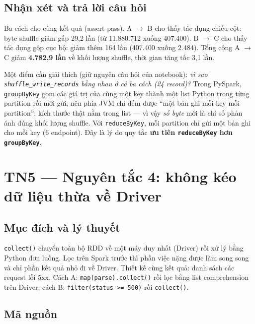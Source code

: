 \documentclass[12pt,a4paper,oneside]{article}
\begin{document}


\subsection{Nhận xét và trả lời câu hỏi}

Ba cách cho cùng kết quả (assert pass). A $\to$ B cho thấy tác dụng chiếu cột: byte shuffle giảm gấp 29,2 lần (từ 11.880.712 xuống 407.400). B $\to$ C cho thấy tác dụng gộp cục bộ: giảm thêm 164 lần (407.400 xuống 2.484). Tổng cộng A $\to$ C giảm \textbf{4.782,9 lần} về khối lượng shuffle, thời gian tăng tốc 3,1 lần.

Một điểm cần giải thích (giữ nguyên câu hỏi của notebook): \emph{vì sao \texttt{shuffle\_write\_records} bằng nhau ở cả ba cách (24 record)?} Trong PySpark, \texttt{groupByKey} gom các giá trị của cùng một key thành một list Python trong từng partition rồi mới gửi, nên phía JVM chỉ đếm được ``một bản ghi mỗi key mỗi partition''; kích thước thật nằm trong list --- vì vậy \emph{số byte} mới là chỉ số phản ánh đúng khối lượng shuffle. Với \texttt{reduceByKey}, mỗi partition chỉ gửi một bản ghi cho mỗi key (6 endpoint). Đây là lý do quy tắc \textbf{ưu tiên \texttt{reduceByKey} hơn \texttt{groupByKey}}.

\section{TN5 --- Nguyên tắc 4: không kéo dữ liệu thừa về Driver}
\label{sec:tn5}

\subsection{Mục đích và lý thuyết}

\texttt{collect()} chuyển toàn bộ RDD về một máy duy nhất (Driver) rồi xử lý bằng Python đơn luồng. Lọc trên Spark trước thì phần việc nặng được làm song song và chỉ phần kết quả nhỏ đi về Driver. Thiết kế cùng kết quả: danh sách các request lỗi 5xx. Cách A: \texttt{map(parse).collect()} rồi lọc bằng list comprehension trên Driver; cách B: \texttt{filter(status >= 500)} rồi \texttt{collect()}.

\subsection{Mã nguồn}
\end{document}
